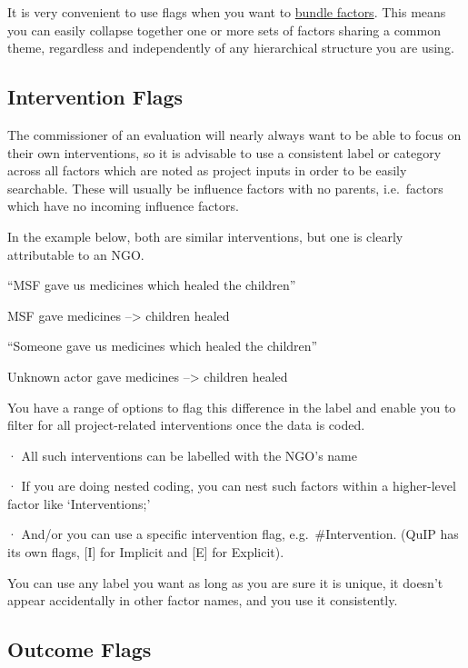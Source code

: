 \documentclass[
]{book}
\begin{document}
It is very convenient to use flags when you want to \protect\hyperlink{bundlefactors}{bundle factors}. This means you can easily collapse together one or more sets of factors sharing a common theme, regardless and independently of any hierarchical structure you are using.

\hypertarget{intervention-flags}{%
\subsection{Intervention Flags}\label{intervention-flags}}

The commissioner of an evaluation will nearly always want to be able to focus on their own interventions, so it is advisable to use a consistent label or category across all factors which are noted as project inputs in order to be easily searchable. These will usually be influence factors with no parents, i.e.~factors which have no incoming influence factors.

In the example below, both are similar interventions, but one is clearly attributable to an NGO.

``MSF gave us medicines which healed the children''

MSF gave medicines --\textgreater{} children healed

``Someone gave us medicines which healed the children''

Unknown actor gave medicines --\textgreater{} children healed

You have a range of options to flag this difference in the label and enable you to filter for all project-related interventions once the data is coded.

· All such interventions can be labelled with the NGO's name

· If you are doing nested coding, you can nest such factors within a higher-level factor like `Interventions;'

· And/or you can use a specific intervention flag, e.g.~\#Intervention. (QuIP has its own flags, {[}I{]} for Implicit and {[}E{]} for Explicit).

You can use any label you want as long as you are sure it is unique, it doesn't appear accidentally in other factor names, and you use it consistently.

\hypertarget{outcome-flags}{%
\subsection{Outcome Flags}\label{outcome-flags}}
\end{document}

